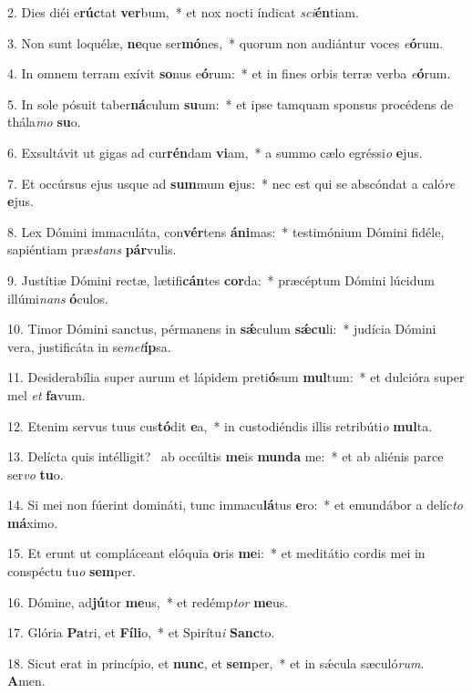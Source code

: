 2. Dies diéi e\textbf{rúc}tat \textbf{ver}bum,~*  et nox nocti índicat \textit{sci}\textbf{én}tiam.\

3. Non sunt loquélæ, \textbf{ne}que ser\textbf{mó}nes,~*  quorum non audiántur voces \textit{e}\textbf{ó}rum.\

4. In omnem terram exívit \textbf{so}nus e\textbf{ó}rum:~*  et in fines orbis terræ verba \textit{e}\textbf{ó}rum.\

5. In sole pósuit taber\textbf{ná}culum \textbf{su}um:~*  et ipse tamquam sponsus procédens de thála\textit{mo} \textbf{su}o.\

6. Exsultávit ut gigas ad cur\textbf{rén}dam \textbf{vi}am,~*  a summo cælo egréssi\textit{o} \textbf{e}jus.\

7. Et occúrsus ejus usque ad \textbf{sum}mum \textbf{e}jus:~*  nec est qui se abscóndat a caló\textit{re} \textbf{e}jus.\

8. Lex Dómini immaculáta, con\textbf{vér}tens \textbf{á}\textbf{ni}mas:~*  testimónium Dómini fidéle, sapiéntiam præ\textit{stans} \textbf{pár}vulis.\

9. Justítiæ Dómini rectæ, lætifi\textbf{cán}tes \textbf{cor}da:~*  præcéptum Dómini lúcidum illúmi\textit{nans} \textbf{ó}culos.\

10. Timor Dómini sanctus, pérmanens in \textbf{sǽ}culum \textbf{sǽ}\textbf{cu}li:~*  judícia Dómini vera, justificáta in se\textit{met}\textbf{íp}sa.\

11. Desiderabília super aurum et lápidem preti\textbf{ó}sum \textbf{mul}tum:~*  et dulcióra super mel \textit{et} \textbf{fa}vum.\

12. Etenim servus tuus cus\textbf{tó}dit \textbf{e}a,~*  in custodiéndis illis retribúti\textit{o} \textbf{mul}ta.\

13. Delícta quis intélligit? \dag\  ab occúltis \textbf{me}is \textbf{mun}\textbf{da} me:~*  et ab aliénis parce ser\textit{vo} \textbf{tu}o.\

14. Si mei non fúerint domináti, tunc immacu\textbf{lá}tus \textbf{e}ro:~*  et emundábor a delíc\textit{to} \textbf{má}ximo.\

15. Et erunt ut compláceant elóquia \textbf{o}ris \textbf{me}i:~*  et meditátio cordis mei in conspéctu tu\textit{o} \textbf{sem}per.\

16. Dómine, ad\textbf{jú}tor \textbf{me}us,~*  et redémp\textit{tor} \textbf{me}us.\

17. Glória \textbf{Pa}tri, et \textbf{Fí}\textbf{li}o,~*  et Spirítu\textit{i} \textbf{Sanc}to.\

18. Sicut erat in princípio, et \textbf{nunc}, et \textbf{sem}per,~*  et in sǽcula sæculó\textit{rum}. \textbf{A}men.\

